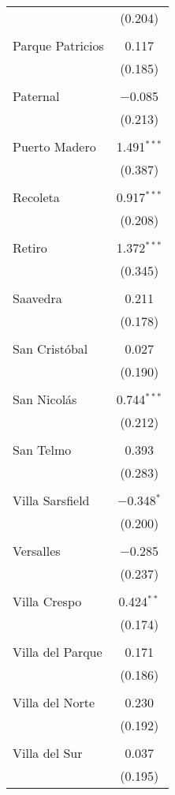 \begin{table}[!htbp]
\begin{tabular}{@{\extracolsep{5pt}}lc}
  & (0.204) \\ 
  & \\ 
 Parque Patricios & 0.117 \\ 
  & (0.185) \\ 
  & \\ 
 Paternal & $-$0.085 \\ 
  & (0.213) \\ 
  & \\ 
 Puerto Madero & 1.491$^{***}$ \\ 
  & (0.387) \\ 
  & \\ 
 Recoleta & 0.917$^{***}$ \\ 
  & (0.208) \\ 
  & \\ 
 Retiro & 1.372$^{***}$ \\ 
  & (0.345) \\ 
  & \\ 
 Saavedra & 0.211 \\ 
  & (0.178) \\ 
  & \\ 
 San Cristóbal & 0.027 \\ 
  & (0.190) \\ 
  & \\ 
 San Nicolás & 0.744$^{***}$ \\ 
  & (0.212) \\ 
  & \\ 
 San Telmo & 0.393 \\ 
  & (0.283) \\ 
  & \\ 
 Villa Sarsfield & $-$0.348$^{*}$ \\ 
  & (0.200) \\ 
  & \\ 
 Versalles & $-$0.285 \\ 
  & (0.237) \\ 
  & \\ 
 Villa Crespo & 0.424$^{**}$ \\ 
  & (0.174) \\ 
  & \\ 
 Villa del Parque & 0.171 \\ 
  & (0.186) \\ 
  & \\ 
 Villa del Norte & 0.230 \\ 
  & (0.192) \\ 
  & \\ 
 Villa del Sur & 0.037 \\ 
  & (0.195) \\ 

\end{tabular}
\end{table}
